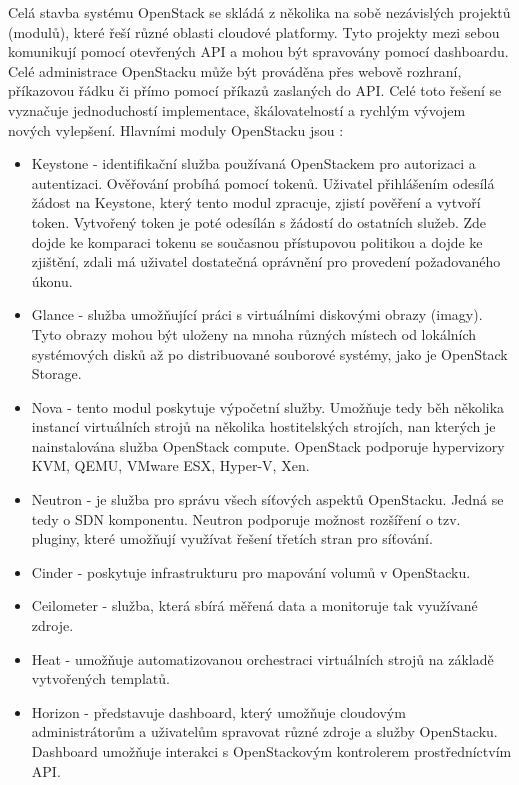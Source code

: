 Celá stavba systému OpenStack se skládá z několika na sobě nezávislých projektů (modulů), které řeší různé oblasti cloudové platformy. Tyto projekty mezi sebou komunikují pomocí otevřených API a mohou být spravovány pomocí dashboardu. Celé administrace OpenStacku může být prováděna přes webově rozhraní, příkazovou řádku či přímo pomocí příkazů zaslaných do API. Celé toto řešení se vyznačuje jednoduchostí implementace, škálovatelností a rychlým vývojem nových vylepšení. Hlavními moduly OpenStacku jsou \cite{OpenStack} \cite{OpenStack2}:

\begin{itemize}
\item Keystone - identifikační služba používaná OpenStackem pro autorizaci a autentizaci. Ověřování probíhá pomocí tokenů. Uživatel přihlášením odesílá žádost na Keystone, který tento modul zpracuje, zjistí pověření a vytvoří token. Vytvořený token je poté odesílán s žádostí do ostatních služeb. Zde dojde ke komparaci tokenu se současnou přístupovou politikou a dojde ke zjištění, zdali má uživatel dostatečná oprávnění pro provedení požadovaného úkonu.
\item Glance - služba umožňující práci s virtuálními diskovými obrazy (imagy). Tyto obrazy mohou být uloženy na mnoha různých místech od lokálních systémových disků až po distribuované souborové systémy, jako je OpenStack Storage.
\item Nova - tento modul poskytuje výpočetní služby. Umožňuje tedy běh několika instancí virtuálních strojů na několika hostitelských strojích, nan kterých je nainstalována služba OpenStack compute. OpenStack podporuje hypervizory KVM, QEMU, VMware ESX, Hyper-V, Xen. 
\item Neutron - je služba pro správu všech síťových aspektů OpenStacku. Jedná se tedy o SDN komponentu. Neutron podporuje možnost rozšíření o tzv. pluginy, které umožňují využívat řešení třetích stran pro síťování.
\item Cinder - poskytuje infrastrukturu pro mapování volumů v OpenStacku.
\item Ceilometer - služba, která sbírá měřená data a monitoruje tak využívané zdroje.
\item Heat - umožňuje automatizovanou orchestraci virtuálních strojů na základě vytvořených templatů.
\item Horizon - představuje dashboard, který umožňuje cloudovým administrátorům a uživatelům spravovat různé zdroje a služby OpenStacku. Dashboard umožňuje interakci s OpenStackovým kontrolerem prostředníctvím API. 
\end{itemize}

